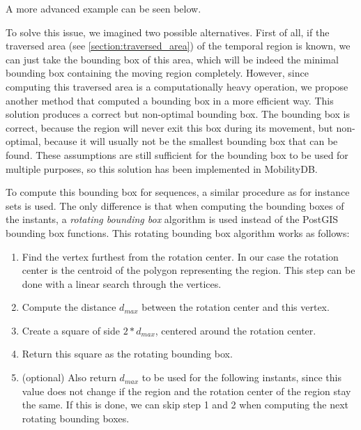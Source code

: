 A more advanced example can be seen below.


To solve this issue, we imagined two possible alternatives. First of all, if the traversed area (see \ref{section:traversed_area}) of the temporal region is known, we can just take the bounding box of this area, which will be indeed the minimal bounding box containing the moving region completely. However, since computing this traversed area is a computationally heavy operation, we propose another method that computed a bounding box in a more efficient way. This solution produces a correct but non-optimal bounding box. The bounding box is correct, because the region will never exit this box during its movement, but non-optimal, because it will usually not be the smallest bounding box that can be found. These assumptions are still sufficient for the bounding box to be used for multiple purposes, so this solution has been implemented in MobilityDB.

To compute this bounding box for sequences, a similar procedure as for instance sets is used. The only difference is that when computing the bounding boxes of the instants, a \textit{rotating bounding box} algorithm is used instead of the PostGIS bounding box functions. This rotating bounding box algorithm works as follows:

\begin{enumerate}
    \item Find the vertex furthest from the rotation center. In our case the rotation center is the centroid of the polygon representing the region. This step can be done with a linear search through the vertices.
    \item Compute the distance $d_{max}$ between the rotation center and this vertex.
    \item Create a square of side $2*d_{max}$, centered around the rotation center.
    \item Return this square as the rotating bounding box.
    \item (optional) Also return $d_{max}$ to be used for the following instants, since this value does not change if the region and the rotation center of the region stay the same. If this is done, we can skip step 1 and 2 when computing the next rotating bounding boxes.
\end{enumerate}


